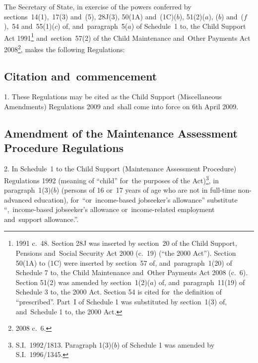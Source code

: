 \documentclass[12pt,a4paper]{article}
\title{\regstitle}
\author{S.I.\ 2009 No.\ 396}
\date{Made
25th February 2009\\
Laid before Parliament
4th March 2009\\
Coming into~force
6th April 2009
}
\begin{document}
\maketitle

\begin{sloppypar}
\noindent
The Secretary of State, in exercise of the powers conferred by sections~14(1),~17(3) and~(5), 28J(3), 50(1A) and~(1C)($b$), 51(2)($a$), ($b$)  and~($f$),~54 and~55(1)($c$)  of, and~paragraph~5($a$)  of Schedule~1 to, the Child Support Act 1991\footnote{1991 c.~48. Section 28J was inserted by section~20 of the Child Support, Pensions and~Social Security Act 2000 (c.~19) (“the 2000 Act”). Section 50(1A) to (1C) were inserted by section~57 of, and~paragraph~1(20) of Schedule 7 to, the Child Maintenance and~Other Payments Act 2008 (c.~6). Section 51(2) was amended by section~1(2)($a$)  of, and~paragraph~11(19) of Schedule 3 to, the 2000 Act. Section 54 is cited for~the definition of “prescribed”. Part~I of Schedule 1 was substituted by section~1(3) of, and~Schedule 1 to, the 2000 Act.} and~section~57(2) of the Child Maintenance and~Other Payments Act 2008\footnote{2008 c.~6.}, makes the following Regulations: 
\end{sloppypar}

{\sloppy

\tableofcontents

}

\bigskip

\setcounter{secnumdepth}{-2}

\subsection[1. Citation and~commencement]{Citation and~commencement}

1.  These Regulations may be cited as the Child Support (Miscellaneous Amendments) Regulations 2009 and~shall come into force on 6th April 2009.

\subsection[2. Amendment of the Maintenance Assessment Procedure Regulations]{Amendment of the Maintenance Assessment Procedure Regulations}

2.  In Schedule~1 to the Child Support (Maintenance Assessment Procedure) Regulations 1992 (meaning of “child” for~the purposes of the Act)\footnote{S.I.~1992/1813. Paragraph 1(3)($b$)  of Schedule 1 was amended by S.I.~1996/1345.}, in paragraph~1(3)($b$)  (persons of 16 or~17 years of age who are not in full-time non-advanced education), for~“or~income-based jobseeker’s allowance” substitute “,~income-based jobseeker’s allowance or~income-related employment and~support allowance.”.
\end{document}
